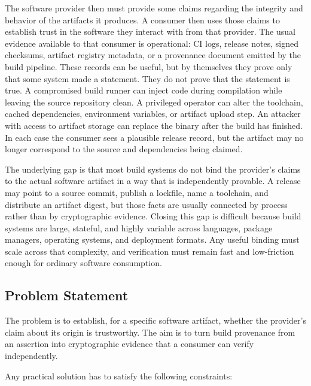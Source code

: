 \documentclass[11pt]{article}
\begin{document}
The software provider then must provide some claims regarding the integrity and behavior of the artifacts it produces. A consumer then uses those claims to establish trust in the software they interact with from that provider. The usual evidence available to that consumer is operational: CI logs, release notes, signed checksums, artifact registry metadata, or a provenance document emitted by the build pipeline. These records can be useful, but by themselves they prove only that some system made a statement. They do not prove that the statement is true. A compromised build runner can inject code during compilation while leaving the source repository clean. A privileged operator can alter the toolchain, cached dependencies, environment variables, or artifact upload step. An attacker with access to artifact storage can replace the binary after the build has finished. In each case the consumer sees a plausible release record, but the artifact may no longer correspond to the source and dependencies being claimed.

The underlying gap is that most build systems do not bind the provider's claims to the actual software artifact in a way that is independently provable. A release may point to a source commit, publish a lockfile, name a toolchain, and distribute an artifact digest, but those facts are usually connected by process rather than by cryptographic evidence. Closing this gap is difficult because build systems are large, stateful, and highly variable across languages, package managers, operating systems, and deployment formats. Any useful binding must scale across that complexity, and verification must remain fast and low-friction enough for ordinary software consumption.

\subsection{Problem Statement}
\label{sec:problem-statement}

The problem is to establish, for a specific software artifact, whether the provider's claim about its origin is trustworthy. The aim is to turn build provenance from an assertion into cryptographic evidence that a consumer can verify independently.

Any practical solution has to satisfy the following constraints:
\end{document}
